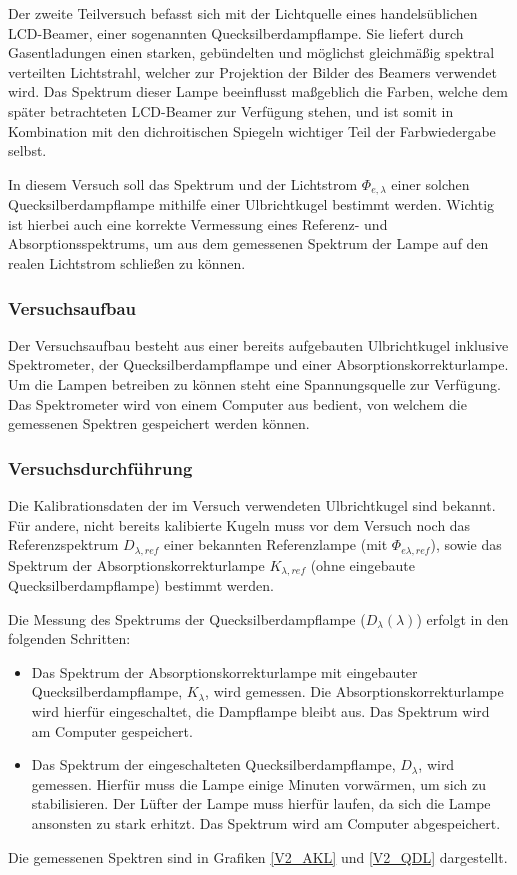 Der zweite Teilversuch befasst sich mit der Lichtquelle eines handelsüblichen LCD-Beamer, einer sogenannten Quecksilberdampflampe. Sie liefert durch Gasentladungen einen starken, gebündelten und möglichst gleichmäßig spektral verteilten Lichtstrahl, welcher zur Projektion der Bilder des Beamers verwendet wird. Das Spektrum dieser Lampe beeinflusst maßgeblich die Farben, welche dem später betrachteten LCD-Beamer zur Verfügung stehen, und ist somit in Kombination mit den dichroitischen Spiegeln wichtiger Teil der Farbwiedergabe selbst.

In diesem Versuch soll das Spektrum und der Lichtstrom $\Phi_{e,\lambda}$ einer solchen Quecksilberdampflampe mithilfe einer Ulbrichtkugel bestimmt werden. Wichtig ist hierbei auch eine korrekte Vermessung eines Referenz- und Absorptionsspektrums, um aus dem gemessenen Spektrum der Lampe auf den realen Lichtstrom schließen zu können.

\subsubsection{Versuchsaufbau}

Der Versuchsaufbau besteht aus einer bereits aufgebauten Ulbrichtkugel inklusive Spektrometer, der Quecksilberdampflampe und einer Absorptionskorrekturlampe. Um die Lampen betreiben zu können steht eine Spannungsquelle zur Verfügung. Das Spektrometer wird von einem Computer aus bedient, von welchem die gemessenen Spektren gespeichert werden können.

\subsubsection{Versuchsdurchführung}

Die Kalibrationsdaten der im Versuch verwendeten Ulbrichtkugel sind bekannt. Für andere, nicht bereits kalibierte Kugeln muss vor dem Versuch noch das Referenzspektrum $D_{\lambda,ref}$ einer bekannten Referenzlampe (mit $\Phi_{e\lambda,ref}$), sowie das Spektrum der Absorptionskorrekturlampe $K_{\lambda,ref}$ (ohne eingebaute Quecksilberdampflampe) bestimmt werden.

Die Messung des Spektrums der Quecksilberdampflampe ($D_\lambda(\lambda)$) erfolgt in den folgenden Schritten:

\begin{itemize}
\item Das Spektrum der Absorptionskorrekturlampe mit eingebauter Quecksilberdampflampe, $K_\lambda$, wird gemessen. Die Absorptionskorrekturlampe wird hierfür eingeschaltet, die Dampflampe bleibt aus. Das Spektrum wird am Computer gespeichert.
\item Das Spektrum der eingeschalteten Quecksilberdampflampe, $D_\lambda$, wird gemessen. Hierfür muss die Lampe einige Minuten vorwärmen, um sich zu stabilisieren. Der Lüfter der Lampe muss hierfür laufen, da sich die Lampe ansonsten zu stark erhitzt. Das Spektrum wird am Computer abgespeichert.
\end{itemize}
Die gemessenen Spektren sind in Grafiken \ref{V2_AKL} und \ref{V2_QDL} dargestellt.

